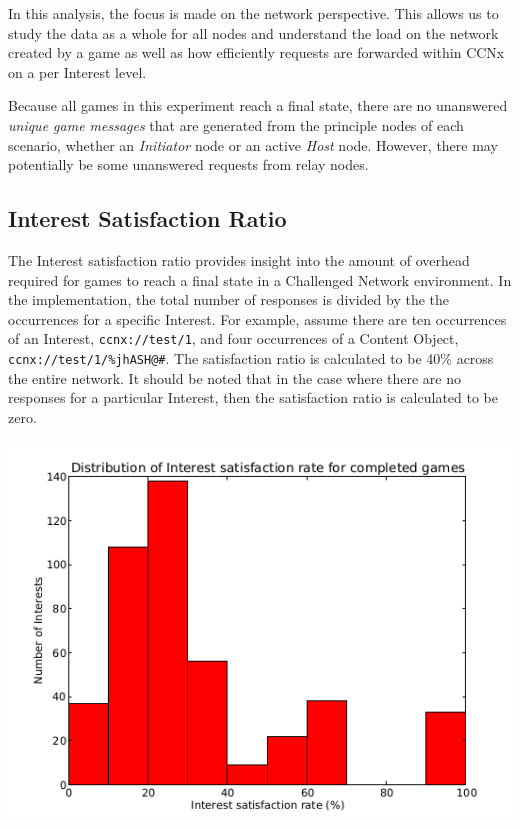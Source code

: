 \documentclass[a4paper,12pt]{report}      %
\begin{document}
In this analysis, the focus is made on the network perspective. This allows us to study the data as a
whole for all nodes and understand the load on the network created by a game as well as how efficiently
requests are forwarded within CCNx on a per Interest level.

Because all games in this experiment reach a final state, there are no unanswered \textsl{unique game messages} that are generated
from the principle nodes of each scenario, whether an \emph{Initiator} node or an active \emph{Host} node. However,
there may potentially be some unanswered requests from relay nodes.

\subsection{Interest Satisfaction Ratio}

The Interest satisfaction ratio provides insight into the amount of overhead required for games to reach a final state in a Challenged Network environment. In the implementation, the total number of responses is divided by the the occurrences for a specific Interest. For example, assume there are ten occurrences of an Interest, \verb!ccnx://test/1!, and four occurrences of a Content Object, \verb!ccnx://test/1/%jhASH@#!. The satisfaction ratio is calculated to be 40\% across the entire network. It should be noted that in the case where there are no responses for a particular Interest, then the satisfaction ratio is calculated to be zero. 

\includegraphics[scale=0.73]{InterestSatisfactionRateHist.jpg}
\end{document}
